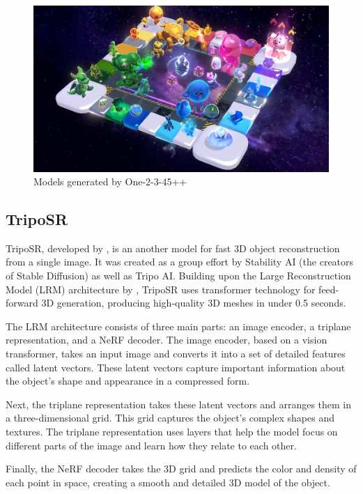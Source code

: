 \begin{figure}
    \centering
    \includegraphics[width=1\linewidth]{images/one-2-3-45++_demo.jpg}
    \caption{Models generated by One-2-3-45++ \autocite{liu_one-2-3-45_2024}}
    \label{fig:one-2-3-4-5-plus-plus-demo}
\end{figure}

\subsection{TripoSR} \label{section:triposr}
TripoSR, developed by \textcite{tochilkin_triposr_2024}, is an another model for fast 3D object reconstruction from a single image.
It was created as a group effort by Stability AI (the creators of Stable Diffusion) as well as Tripo AI.
Building upon the Large Reconstruction Model (LRM) architecture by \textcite{hong_lrm_2024}, TripoSR uses transformer technology for feed-forward 3D generation, producing high-quality 3D meshes in under 0.5 seconds.

The LRM architecture consists of three main parts: an image encoder, a triplane representation, and a NeRF decoder. The image encoder, based on a vision transformer, takes an input image and converts it into a set of detailed features called latent vectors. These latent vectors capture important information about the object's shape and appearance in a compressed form.

Next, the triplane representation takes these latent vectors and arranges them in a three-dimensional grid. This grid captures the object's complex shapes and textures. The triplane representation uses layers that help the model focus on different parts of the image and learn how they relate to each other.

Finally, the NeRF decoder takes the 3D grid and predicts the color and density of each point in space, creating a smooth and detailed 3D model of the object.


